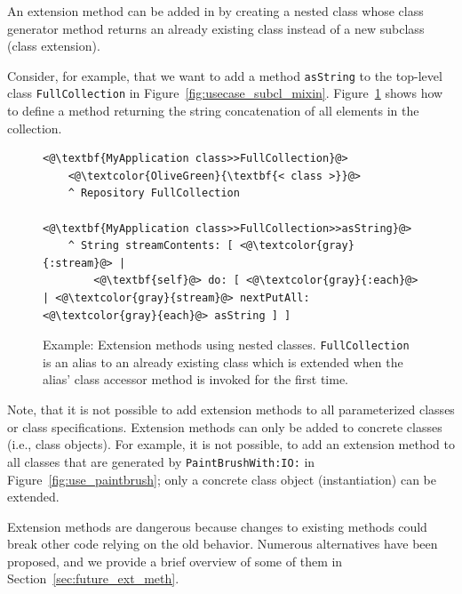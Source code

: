 An extension method can be added in \msname by creating a nested class whose class generator method returns an already existing class instead of a new subclass (class extension).

Consider, for example, that we want to add a method \texttt{asString} to the top-level class \texttt{FullCollection} in Figure~\ref{fig:usecase_subcl_mixin}. Figure~\ref{fig:use_ext_meth} shows how to define a method returning the string concatenation of all elements in the collection.

\begin{figure}[!htp]
\begin{lstlisting}
<@\textbf{MyApplication class>>FullCollection}@>
    <@\textcolor{OliveGreen}{\textbf{< class >}}@>
    ^ Repository FullCollection

<@\textbf{MyApplication class>>FullCollection>>asString}@>
    ^ String streamContents: [ <@\textcolor{gray}{:stream}@> |
        <@\textbf{self}@> do: [ <@\textcolor{gray}{:each}@> | <@\textcolor{gray}{stream}@> nextPutAll: <@\textcolor{gray}{each}@> asString ] ]
\end{lstlisting}
\caption[Example: Extension methods using nested classes]{Example: Extension methods using nested classes. \texttt{FullCollection} is an alias to an already existing class which is extended when the alias' class accessor method is invoked for the first time.}
\label{fig:use_ext_meth}
\end{figure}

Note, that it is not possible to add extension methods to all parameterized classes or class specifications. Extension methods can only be added to concrete classes (i.e., class objects). For example, it is not possible, to add an extension method to all classes that are generated by \texttt{PaintBrushWith:IO:} in Figure~\ref{fig:use_paintbrush}; only a concrete class object (instantiation) can be extended.

Extension methods are dangerous because changes to existing methods could break other code relying on the old behavior. Numerous alternatives have been proposed, and we provide a brief overview of some of them in Section~\ref{sec:future_ext_meth}.
